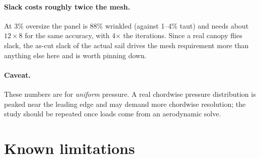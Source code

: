 \documentclass[11pt,a4paper]{article}
\begin{document}
\paragraph{Slack costs roughly twice the mesh.} At 3\% oversize the panel is
88\% wrinkled (against 1--4\% taut) and needs about $12\times8$ for the same
accuracy, with 4$\times$ the iterations. Since a real canopy flies slack, the
as-cut slack of the actual sail drives the mesh requirement more than anything
else here and is worth pinning down.

\paragraph{Caveat.} These numbers are for \emph{uniform} pressure. A real
chordwise pressure distribution is peaked near the leading edge and may demand
more chordwise resolution; the study should be repeated once loads come from an
aerodynamic solve.

\section{Known limitations}
\end{document}
